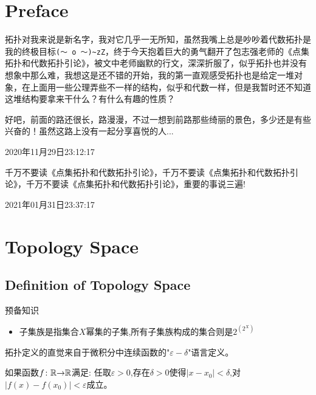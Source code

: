 \tableofcontents

\newpage

\section{Preface}

拓扑对我来说是新名字，我对它几乎一无所知，虽然我嘴上总是吵吵着代数拓扑是我的终极目标\verb|(～ o ～)~zZ|，终于今天抱着巨大的勇气翻开了包志强老师的《点集拓扑和代数拓扑引论》，被文中老师幽默的行文，深深折服了，似乎拓扑也并没有想象中那么难，我想这是还不错的开始，我的第一直观感受拓扑也是给定一堆对象，在上面用一些公理弄些不一样的结构，似乎和代数一样，但是我暂时还不知道这堆结构要拿来干什么？有什么有趣的性质？

好吧，前面的路还很长，路漫漫，不过一想到前路那些绮丽的景色，多少还是有些兴奋的！虽然这路上没有一起分享喜悦的人...

2020年11月29日23:12:17

千万不要读《点集拓扑和代数拓扑引论》，千万不要读《点集拓扑和代数拓扑引论》，千万不要读《点集拓扑和代数拓扑引论》，重要的事说三遍!

2021年01月31日23:37:17
\newpage

\section{Topology Space}
\subsection{Definition of Topology Space} 
预备知识

\begin{itemize}
	\item 子集族是指集合$X$幂集的子集,所有子集族构成的集合则是$2^{(2^X)}$				
\end{itemize}


拓扑定义的直觉来自于微积分中连续函数的"$\varepsilon-\delta$"语言定义。

\begin{definition}\label{def:R-valued-con-f}
如果函数${f}\colon{\mathbb{R}}{\to}{\mathbb{R}}$满足: 任取$\varepsilon > 0$,存在$\delta > 0$使得$|x-x_0| < \delta$,对$|f(x)-f(x_0)| < \varepsilon$成立。
\end{definition}

